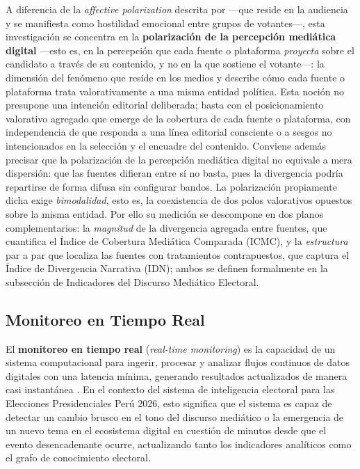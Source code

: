 A diferencia de la \textit{affective polarization} descrita por \textcite{mc_iyengar2019origins} —que reside en la audiencia y se manifiesta como hostilidad emocional entre grupos de votantes—, esta investigación se concentra en la \textbf{polarización de la percepción mediática digital} —esto es, en la percepción que cada fuente o plataforma \emph{proyecta} sobre el candidato a través de su contenido, y no en la que sostiene el votante—: la dimensión del fenómeno que reside en los medios y describe cómo cada fuente o plataforma trata valorativamente a una misma entidad política. Esta noción no presupone una intención editorial deliberada; basta con el posicionamiento valorativo agregado que emerge de la cobertura de cada fuente o plataforma, con independencia de que responda a una línea editorial consciente o a sesgos no intencionados en la selección y el encuadre del contenido. Conviene además precisar que la polarización de la percepción mediática digital no equivale a mera dispersión: que las fuentes difieran entre sí no basta, pues la divergencia podría repartirse de forma difusa sin configurar bandos. La polarización propiamente dicha exige \textit{bimodalidad}, esto es, la coexistencia de dos polos valorativos opuestos sobre la misma entidad. Por ello su medición se descompone en dos planos complementarios: la \textit{magnitud} de la divergencia agregada entre fuentes, que cuantifica el Índice de Cobertura Mediática Comparada (ICMC), y la \textit{estructura} par a par que localiza las fuentes con tratamientos contrapuestos, que captura el Índice de Divergencia Narrativa (IDN); ambos se definen formalmente en la subsección de Indicadores del Discurso Mediático Electoral.

\subsection{Monitoreo en Tiempo Real}

El \textbf{monitoreo en tiempo real} (\textit{real-time monitoring}) es la capacidad de un sistema computacional para ingerir, procesar y analizar flujos continuos de datos digitales con una latencia mínima, generando resultados actualizados de manera casi instantánea \parencite{mc_stonebraker2005streaming}. En el contexto del sistema de inteligencia electoral para las Elecciones Presidenciales Perú 2026, esto significa que el sistema es capaz de detectar un cambio brusco en el tono del discurso mediático o la emergencia de un nuevo tema en el ecosistema digital en cuestión de minutos desde que el evento desencadenante ocurre, actualizando tanto los indicadores analíticos como el grafo de conocimiento electoral.

